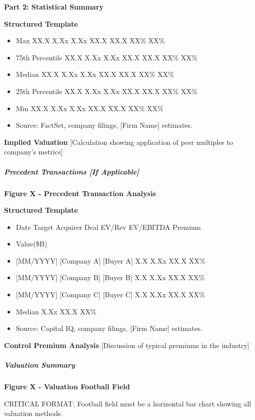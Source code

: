 \documentclass[11pt]{article}
\begin{document}
\textbf{Part 2: Statistical Summary}

\textbf{Structured Template}
\begin{itemize}[leftmargin=*,itemsep=2pt,topsep=2pt]
\item {} Max XX.X X.Xx X.Xx XX.X XX.X XX\% XX\%
\item {} 75th Percentile XX.X X.Xx X.Xx XX.X XX.X XX\% XX\%
\item {} Median XX.X X.Xx X.Xx XX.X XX.X XX\% XX\%
\item {} 25th Percentile XX.X X.Xx X.Xx XX.X XX.X XX\% XX\%
\item {} Min XX.X X.Xx X.Xx XX.X XX.X XX\% XX\%
\item {} Source: FactSet, company filings, [Firm Name] estimates.
\end{itemize}

\textbf{Implied Valuation} [Calculation showing application of peer multiples to company's metrics]


\subparagraph{Precedent Transactions [If Applicable]}\mbox{}\par

\textbf{Figure X - Precedent Transaction Analysis}

\textbf{Structured Template}
\begin{itemize}[leftmargin=*,itemsep=2pt,topsep=2pt]
\item {} Date Target Acquirer Deal EV/Rev EV/EBITDA Premium
\item {} Value(\$B)
\item {} [MM/YYYY] [Company A] [Buyer A] X.X X.Xx XX.X XX\%
\item {} [MM/YYYY] [Company B] [Buyer B] X.X X.Xx XX.X XX\%
\item {} [MM/YYYY] [Company C] [Buyer C] X.X X.Xx XX.X XX\%
\item {} Median X.Xx XX.X XX\%
\item {} Source: Capital IQ, company filings, [Firm Name] estimates.
\end{itemize}

\textbf{Control Premium Analysis} [Discussion of typical premiums in the industry]


\subparagraph{Valuation Summary}\mbox{}\par

\textbf{Figure X - Valuation Football Field}


CRITICAL FORMAT: Football field must be a horizontal bar chart showing all valuation methods.
\end{document}
